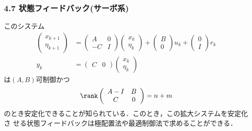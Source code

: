 \begin{frame}[t]
\frametitle{4.7 状態フィードバック(サーボ系)}
\addtocounter{equation}{-2}
このシステム
\begin{align}
 \left(\begin{array}{c}
	x_{k+1} \\
	\eta_{k+1}
       \end{array}\right)
 &=
 \left(\begin{array}{cc}
        A  & 0 \\
	-C & I
       \end{array}\right)
 \left(\begin{array}{c}
        x_k \\
	\eta_k
       \end{array}\right)
 +
 \left(\begin{array}{c}
	B \\
	0
       \end{array}\right)
 u_k +
 \left(\begin{array}{c}
        0 \\
	I
       \end{array}\right) 
 r_k \\
 y_k &=
  \left(\begin{array}{cc}
         C & 0 
	\end{array}\right)
  \left(\begin{array}{c}
         x_k \\
	 \eta_k
	\end{array}\right)
\end{align}
は$(A, B)$可制御かつ
\begin{equation}
 \rank \left(\begin{array}{cc}
	      A - I  & B \\
	      C      & 0
	     \end{array}\right)
 = n + m
\end{equation}
のとき安定化できることが知られている．このとき，この拡大システムを安定化さ
せる状態フィードバックは極配置法や最適制御法で求めることができる．
\end{frame}

